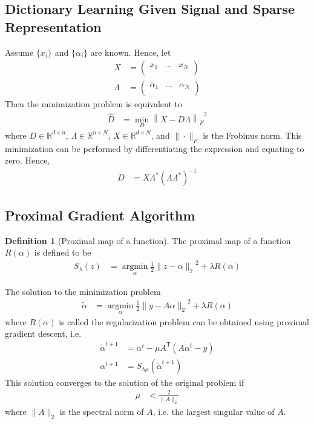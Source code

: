 \documentclass[titlepage, fleqn, a4paper, 12pt, twoside]{article}
\theoremstyle{definition}
\newtheorem{definition}{Definition}
\theoremstyle{theorem}
\renewcommand{\tilde}{\widetilde}
\DeclareMathOperator{\argmin}{\mathrm{argmin}}
\def\transpose#1{{#1}^{\mathsf{T}}}
\begin{document}
\subsection{Dictionary Learning Given Signal and Sparse Representation}

Assume $\{x_i\}$ and $\{\alpha_i\}$ are known.
Hence, let
\begin{align*}
	X &=
		\begin{pmatrix}
			x_1 & \dots & x_N\\
		\end{pmatrix}\\
	\Lambda &=
		\begin{pmatrix}
			\alpha_1 & \dots & \alpha_N\\
		\end{pmatrix}
\end{align*}
Then the minimization problem is equivalent to
\begin{align*}
	\hat{D} &= \min\limits_{D} {\left\| X - D \Lambda \right\|_F}^2
\end{align*}
where $D \in \mathbb{R}^{d \times n}$, $\Lambda \in \mathbb{R}^{n \times N}$, $X \in \mathbb{R}^{d \times N}$, and $\|\cdot\|_F$ is the Frobinus norm.
This minimization can be performed by differentiating the expression and equating to zero.
Hence,
\begin{align*}
	D &= X \Lambda^* \left( \Lambda \Lambda^* \right)^{-1}
\end{align*}

\subsection{Proximal Gradient Algorithm}

\begin{definition}[Proximal map of a function]
	The proximal map of a function $R(\alpha)$ is defined to be
	\begin{align*}
		S_{\lambda}(z) &= \argmin\limits_{\alpha} \frac{1}{2} {\|z - \alpha\|_2}^2 + \lambda R(\alpha)
	\end{align*}
\end{definition}

The solution to the minimization problem
\begin{align*}
	\tilde{\alpha} &= \argmin\limits_{\alpha} \frac{1}{2} {\|y - A \alpha\|_2}^2 + \lambda R(\alpha)
\end{align*}
where $R(\alpha)$ is called the regularization problem can be obtained using proximal gradient descent, i.e.
\begin{align*}
	{\tilde{\alpha}}^{t + 1} &= \alpha^t - \mu \transpose{A} \left( A \alpha^t - y \right)\\
	\alpha^{t + 1} &= S_{\lambda \mu} \left( {\tilde{\alpha}}^{t + 1} \right)
\end{align*}
This solution converges to the solution of the original problem if
\begin{align*}
	\mu &< \frac{2}{\|A\|_2}
\end{align*}
where $\|A\|_2$ is the spectral norm of $A$, i.e. the largest singular value of $A$.\\
\end{document}
